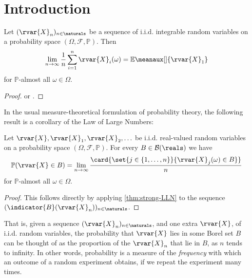 \documentclass[article, a4paper, 11pt, oneside]{memoir}
\title{\doctitle}
\author{\docauthor}
\numberwithin{equation}{chapter}
\newcommand{\calB}{\mathcal{B}}
\newcommand{\calF}{\mathcal{F}}
\newcommand{\borel}[1]{\calB(#1)}
\renewcommand{\P}{\mathbb{P}}
\renewcommand{\mean}[2][]{\mathbb{E}\meanaux[#1]{#2}}
\begin{document}
\maketitle

\chapter{Introduction}

\begin{theorem}
    \label{thm:strong-LLN}
    Let $(\rvar{X}_n)_{n\in\naturals}$ be a sequence of i.i.d. integrable random variables on a probability space $(\Omega,\calF,\P)$. Then
    \begin{equation*}
        \lim_{n\to\infty} \frac{1}{n} \sum_{i=1}^n \rvar{X}_i(\omega)
            = \mean{\rvar{X}_1}
    \end{equation*}
    for $\P$-almost all $\omega \in \Omega$.
\end{theorem}

\begin{proof}
    \textcite[Theorem~12.1]{bauer1995} or \textcite[Theorem~22.1]{billingsley1995}.
\end{proof}

In the usual measure-theoretical formulation of probability theory, the following result is a corollary of the Law of Large Numbers:

\begin{theorem}
    Let $\rvar{X}, \rvar{X}_1, \rvar{X}_2, \ldots$ be i.i.d. real-valued random variables on a probability space $(\Omega, \calF, \P)$. For every $B \in \borel{\reals}$ we have
    \begin{equation*}
        \P(\rvar{X} \in B)
            = \lim_{n\to\infty} \frac{
                \card{ \set{j \in \{1, \ldots, n\} }{ \rvar{X}_j(\omega) \in B } }
            }{
                n
            }
    \end{equation*}
    for $\P$-almost all $\omega \in \Omega$.
\end{theorem}

\begin{proof}
    This follows directly by applying \cref{thm:strong-LLN} to the sequence $(\indicator{B}(\rvar{X}_n))_{n\in\naturals}$.
\end{proof}
%
That is, given a sequence $(\rvar{X}_n)_{n\in\naturals}$, and one extra $\rvar{X}$, of i.i.d. random variables, the probability that $\rvar{X}$ lies in some Borel set $B$ can be thought of as the proportion of the $\rvar{X}_n$ that lie in $B$, as $n$ tends to infinity. In other words, probability is a measure of the \emph{frequency} with which an outcome of a random experiment obtains, if we repeat the experiment many times.
\end{document}
